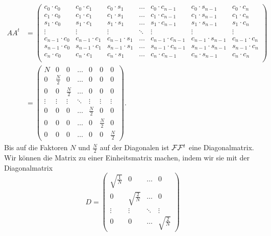 \begin{align*}
AA^t
&=
\begin{pmatrix}
c_0\cdot c_0&
	c_0\cdot c_1&
		c_0\cdot s_1&
			\dots&
				c_0\cdot c_{n-1}&
					c_0\cdot s_{n-1}&
						c_0\cdot c_n\\
c_1\cdot c_0&
	c_1\cdot c_1&
		c_1\cdot s_1&
			\dots&
				c_1\cdot c_{n-1}&
					c_1\cdot s_{n-1}&
						c_1\cdot c_n\\
s_1\cdot c_0&
	s_1\cdot c_1&
		s_1\cdot s_1&
			\dots&
				s_1\cdot c_{n-1}&
					s_1\cdot s_{n-1}&
						s_1\cdot c_n\\
\vdots	&\vdots	&\vdots	&\ddots	&\vdots	&\vdots	&\vdots	\\
c_{n-1}\cdot c_0&
	c_{n-1}\cdot c_1&
		c_{n-1}\cdot s_1&
			\dots&
				c_{n-1}\cdot c_{n-1}&
					c_{n-1}\cdot s_{n-1}&
						c_{n-1}\cdot c_n\\
s_{n-1}\cdot c_0&
	s_{n-1}\cdot c_1&
		s_{n-1}\cdot s_1&
			\dots&
				s_{n-1}\cdot c_{n-1}&
					s_{n-1}\cdot s_{n-1}&
						s_{n-1}\cdot c_n\\
c_n\cdot c_0&
	c_n\cdot c_1&
		c_n\cdot s_1&
			\dots&
				c_n\cdot c_{n-1}&
					c_n\cdot s_{n-1}&
						c_n\cdot c_n\\
\end{pmatrix}
\\
&=
\begin{pmatrix}
N     &0        &0        &\dots    &0        &0        &0        \\
0     &\frac{N}2&0        &\dots    &0        &0        &0        \\
0     &0        &\frac{N}2&\dots    &0        &0        &0        \\
\vdots&\vdots   &\vdots   &\ddots   &\vdots   &\vdots   &\vdots   \\
0     &0        &0        &\dots    &\frac{N}2&0        &0        \\
0     &0        &0        &\dots    &0        &\frac{N}2&0        \\
0     &0        &0        &\dots    &0        &0        &\frac{N}2
\end{pmatrix}.
\end{align*}
Bis auf die Faktoren $N$ und $\frac{N}2$ auf der Diagonalen ist
${\cal F}{\cal F}^t$ 
eine Diagonalmatrix.
Wir können die Matrix zu einer Einheitsmatrix machen, indem wir 
sie mit der Diagonalmatrix
\begin{equation}
D
=
\begin{pmatrix}
\sqrt{\frac1N}&0&\dots&0\\
0&\sqrt{\frac{2}{N}}&\dots&0\\
\vdots&\vdots&\ddots&\vdots\\
0&0&\dots&\sqrt{\frac{2}{N}}
\end{pmatrix}
\end{equation}
